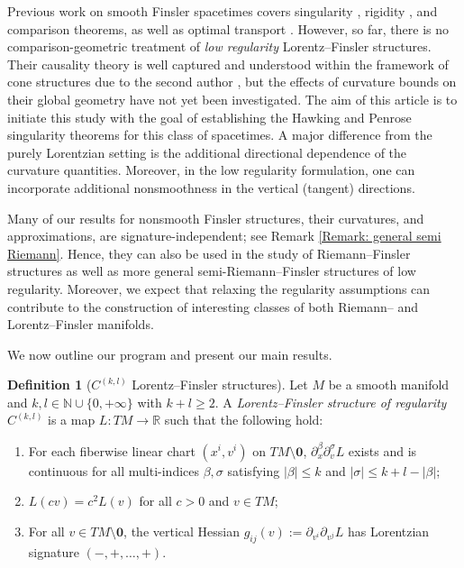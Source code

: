 \documentclass[a4paper,11pt]{article}
\numberwithin{equation}{section}
\theoremstyle{definition}
\newtheorem{Definition}{Definition}[section]
\theoremstyle{plain}
\newcommand{\R}{\mathbb R}
\newcommand{\N}{\mathbb N}
\begin{document}
Previous work on smooth Finsler spacetimes covers singularity \cite{MinguzziRaychaudhuri, AJ16, LuMinguzziOhtaSingularity}, rigidity \cite{LuMinguzziOhtaSplitting, CaponioOhanyanOhta}, and comparison \cite{LuMinguzziOhtaComparison} theorems, as well as optimal transport \cite{BraunOhta}.
However, so far, there is no comparison-geometric treatment of \emph{low regularity} Lorentz--Finsler structures. Their causality theory is well captured and understood within the framework of cone structures due to the second author \cite{Minguzziconestructure}, but the effects of curvature bounds on their global geometry have not yet been investigated. 
The aim of this article is to initiate this study with the goal of establishing the Hawking and Penrose singularity theorems for this class of spacetimes.
A major difference from the purely Lorentzian setting is the additional directional dependence of the curvature quantities. 
Moreover, in the low regularity formulation, one can incorporate additional nonsmoothness in the vertical (tangent) directions. 

Many of our results for nonsmooth Finsler structures, their curvatures, and approximations, are signature-independent; see Remark \ref{Remark: general semi Riemann}. 
Hence, they can also be used in the study of Riemann--Finsler structures as well as more general semi-Riemann--Finsler structures of low regularity. 
Moreover, we expect that relaxing the regularity assumptions can contribute to the construction of interesting classes of both Riemann-- and Lorentz--Finsler manifolds.

We now outline our program and present our main results.

\begin{Definition}[$C^{(k,l)}$ Lorentz--Finsler structures]
Let $M$ be a smooth manifold and $k,l \in \N \cup \{0,+\infty\}$ with $k + l \geq 2$. A \emph{Lorentz--Finsler structure of regularity $C^{(k,l)}$} is a map $L: TM \to \R$ such that the following hold:
\begin{enumerate}
    \item For each fiberwise linear chart $(x^i,v^i)$ on $TM \setminus \mathbf 0$, $\partial_x^\beta \partial_v^\sigma L$ exists and is continuous for all multi-indices $\beta,\sigma$ satisfying $|\beta| \leq k$ and $|\sigma| \leq k + l - |\beta|$;
    \item $L(cv) = c^2 L(v)$ for all $c > 0$ and $v \in TM$;
    \item For all $v \in TM \setminus \mathbf 0$, the vertical Hessian $g_{ij}(v):=\partial_{v^i} \partial_{v^j} L$ has Lorentzian signature $(-,+,\dots,+)$.
\end{enumerate}
\end{Definition}
\end{document}
